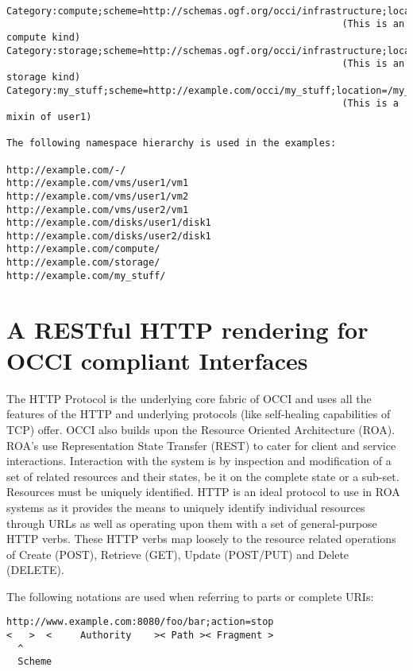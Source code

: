 \documentclass[10pt,a4paper]{article}
\begin{document}
\begin{verbatim}

Category:compute;scheme=http://schemas.ogf.org/occi/infrastructure;location=/compute 
                                                           (This is an compute kind)
Category:storage;scheme=http://schemas.ogf.org/occi/infrastructure;location=/storage 
                                                           (This is an storage kind)
Category:my_stuff;scheme=http://example.com/occi/my_stuff;location=/my_stuff 
                                                           (This is a mixin of user1)

The following namespace hierarchy is used in the examples:

http://example.com/-/
http://example.com/vms/user1/vm1
http://example.com/vms/user1/vm2
http://example.com/vms/user2/vm1
http://example.com/disks/user1/disk1
http://example.com/disks/user2/disk1
http://example.com/compute/
http://example.com/storage/
http://example.com/my_stuff/
\end{verbatim}

\section{A RESTful HTTP rendering for OCCI compliant Interfaces}
The HTTP Protocol is the underlying core fabric of OCCI and uses all
the features of the HTTP and underlying protocols (like self-healing
capabilities of TCP) offer. OCCI also builds upon the Resource
Oriented Architecture (ROA). ROA's use Representation State Transfer
(REST) to cater for client and service interactions. Interaction with
the system is by inspection and modification of a set of related
resources and their states, be it on the complete state or a
sub-set. Resources must be uniquely identified. HTTP is an ideal
protocol to use in ROA systems as it provides the means to uniquely
identify individual resources through URLs as well as operating upon
them with a set of general-purpose HTTP verbs. These HTTP verbs map
loosely to the resource related operations of Create (POST), Retrieve
(GET), Update (POST/PUT) and Delete (DELETE).

The following notations are used when referring to parts or complete
URIs:

\begin{verbatim}
http://www.example.com:8080/foo/bar;action=stop
<   >  <     Authority    >< Path >< Fragment >
  ^
  Scheme
\end{verbatim}
\end{document}
